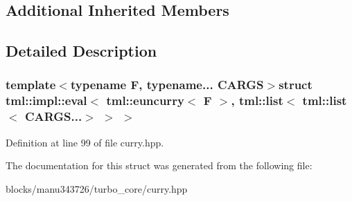 \subsection*{Additional Inherited Members}


\subsection{Detailed Description}
\subsubsection*{template$<$typename F, typename... C\+A\+R\+G\+S$>$struct tml\+::impl\+::eval$<$ tml\+::euncurry$<$ F $>$, tml\+::list$<$ tml\+::list$<$ C\+A\+R\+G\+S...$>$ $>$ $>$}



Definition at line 99 of file curry.\+hpp.



The documentation for this struct was generated from the following file\+:\begin{DoxyCompactItemize}
\item 
blocks/manu343726/turbo\+\_\+core/curry.\+hpp\end{DoxyCompactItemize}
